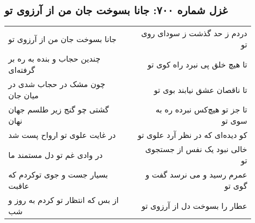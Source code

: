 \begin{center}
\section*{غزل شماره ۷۰۰: جانا بسوخت جان من از آرزوی تو}
\label{sec:700}
\begin{longtable}{l p{0.5cm} r}
جانا بسوخت جان من از آرزوی تو
&&
دردم ز حد گذشت ز سودای روی تو
\\
چندین حجاب و بنده به ره بر گرفته‌ای
&&
تا هیچ خلق پی نبرد راه کوی تو
\\
چون مشک در حجاب شدی در میان جان
&&
تا ناقصان عشق نیابند بوی تو
\\
گشتی چو گنج زیر طلسم جهان نهان
&&
تا جز تو هیچ‌کس نبرده ره به سوی تو
\\
در غایت علوی تو ارواح پست شد
&&
کو دیده‌ای که در نظر آرد علوی تو
\\
در وادی غم تو دل مستمند ما
&&
خالی نبود یک نفس از جستجوی تو
\\
بسیار جست و جوی توکردم که عاقبت
&&
عمرم رسید و می نرسد گفت و گوی تو
\\
از بس که انتظار تو کردم به روز و شب
&&
عطار را بسوخت دل از آرزوی تو
\\
\end{longtable}
\end{center}
